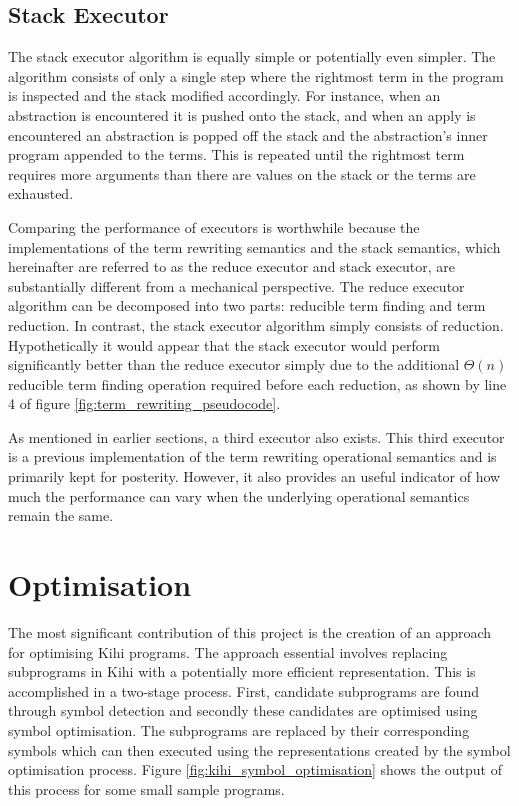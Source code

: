 \subsection{Stack Executor}


The stack executor algorithm is equally simple or potentially even simpler. The algorithm consists of only a single step where the rightmost term in the program is inspected and the stack modified accordingly. For instance, when an abstraction is encountered it is pushed onto the stack, and when an apply is encountered an abstraction is popped off the stack and the abstraction's inner program appended to the terms. This is repeated until the rightmost term requires more arguments than there are values on the stack or the terms are exhausted.

Comparing the performance of executors is worthwhile because the implementations of the term rewriting semantics and the stack semantics, which hereinafter are referred to as the reduce executor and stack executor, are substantially different from a mechanical perspective. The reduce executor algorithm can be decomposed into two parts: reducible term finding and term reduction. In contrast, the stack executor algorithm simply consists of reduction.  Hypothetically it would appear that the stack executor would perform significantly better than the reduce executor simply due to the additional $\Theta(n)$ reducible term finding operation required before each reduction, as shown by line 4 of figure \ref{fig:term_rewriting_pseudocode}.

As mentioned in earlier sections, a third executor also exists. This third executor is a previous implementation of the term rewriting operational semantics and is primarily kept for posterity. However, it also provides an useful indicator of how much the performance can vary when the underlying operational semantics remain the same.


\section{Optimisation}\label{sec:implementation_optimisation}




The most significant contribution of this project is the creation of an approach for optimising Kihi programs. The approach essential involves replacing subprograms in Kihi with a potentially more efficient representation. This is accomplished in a two-stage process. First, candidate subprograms are found through symbol detection and secondly these candidates are optimised using symbol optimisation. The subprograms are replaced by their corresponding symbols which can then executed using the representations created by the symbol optimisation process. Figure \ref{fig:kihi_symbol_optimisation} shows the output of this process for some small sample programs. 


